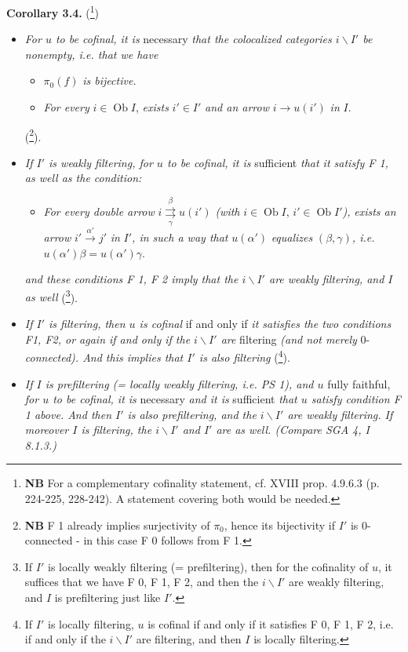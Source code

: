 \documentclass[11pt]{article}
\newcommand{\printedpage}[1]{\marginpar{\footnotesize p.~#1}}
\newcommand{\msp}[1]{\marginpar{\footnotesize [#1]}}
\newcommand{\Ob}{\operatorname{Ob}}
\newcommand{\bs}{\backslash}
\newcommand{\dbl}[2]{\mathrel{\overset{#1}{\underset{#2}{\rightrightarrows}}}}
\begin{document}
\noindent\textbf{Corollary 3.4.} (\footnote[55]{\textbf{NB} For a complementary cofinality statement, cf. XVIII prop. 4.9.6.3 (p. 224-225, 228-242). A statement covering both would be needed.})
\begin{itemize}[label={}]
\item[\textit{a)}] \textit{For $u$ to be cofinal, it is} necessary \textit{that the colocalized categories $i\bs I'$ be nonempty, i.e. that we have}

\msp{page 46}
\begin{itemize}[label={}]
\item[\textit{F 0)}] $\pi_0(f)$ \textit{is bijective.}
\item[\textit{F 1)}] \textit{For every} $i \in \Ob I$, \textit{exists} $i' \in I'$ \textit{and an arrow} $i \longrightarrow u(i')$ \textit{in} $I$.
\end{itemize}
(\footnote[56]{\textbf{NB} F 1 already implies surjectivity of $\pi_0$, hence its bijectivity if $I'$ is 0-connected - in this case F 0 follows from F 1.}).
\item[\textit{b)}] \textit{If $I'$ is weakly filtering, for $u$ to be cofinal, it is} sufficient \textit{that it satisfy F 1, as well as the condition:}
\begin{itemize}[label={}]
\item[\textit{F 2)}] \textit{For every double arrow} $i \dbl{\beta}{\gamma} u(i')$ \textit{(with} $i \in \Ob I$, $i' \in \Ob I'$\textit{),} \textit{exists an arrow} $i' \xrightarrow{\alpha'} j'$ \textit{in} $I'$\textit{, in such a way that} $u(\alpha')$ \textit{equalizes} $(\beta, \gamma)$\textit{, i.e.} $u(\alpha')\beta = u(\alpha')\gamma$.
\end{itemize}
\textit{and these conditions F 1, F 2 imply that the $i\bs I'$ are weakly filtering, and $I$ as well} (\footnote[57]{If $I'$ is locally weakly filtering (= prefiltering), then for the cofinality of $u$, it suffices that we have F 0, F 1, F 2, and then the $i\bs I'$ are weakly filtering, and $I$ is prefiltering just like $I'$.}).

\printedpage{30}
\item[\textit{c)}] \textit{If $I'$ is filtering, then $u$ is cofinal} if and only if \textit{it satisfies the two conditions F1, F2, or again if and only if the $i\bs I'$ are} filtering \textit{(and not merely} 0-\textit{connected). And this implies that $I'$ is also filtering} (\footnote[58]{If $I'$ is locally filtering, $u$ is cofinal if and only if it satisfies F 0, F 1, F 2, i.e. if and only if the $i\bs I'$ are filtering, and then $I$ is locally filtering.}).
\item[\textit{d)}] \textit{If $I$ is prefiltering (= locally weakly filtering, i.e. PS 1), and $u$} fully faithful, \textit{for $u$ to be cofinal, it is} necessary \textit{and it is} sufficient \textit{that $u$ satisfy condition F 1 above. And then $I'$ is also prefiltering, and the $i\bs I'$ are weakly filtering. If moreover $I$ is filtering, the $i\bs I'$ and $I'$ are as well. (Compare SGA 4, I 8.1.3.)}
\end{itemize}
\end{document}
